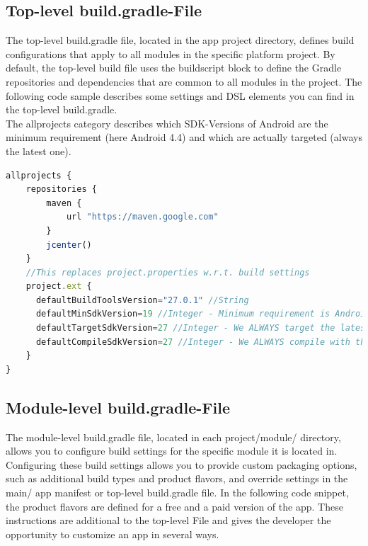 \documentclass[12pt]{article}
\begin{document}
\subsection{Top-level build.gradle-File}

The top-level build.gradle file, located in the app project directory, defines build configurations that apply to all modules in the specific platform project. By default, the top-level build file uses the buildscript block to define the Gradle repositories and dependencies that are common to all modules in the project. The following code sample describes some settings and DSL elements you can find in the top-level build.gradle.\\
The allprojects category describes which SDK-Versions of Android are the minimum requirement (here Android 4.4) and which are actually targeted (always the latest one).

\begin{lstlisting}[language=javascript]
allprojects {
    repositories {
        maven {
            url "https://maven.google.com"
        }
        jcenter()
    }
    //This replaces project.properties w.r.t. build settings
    project.ext {
      defaultBuildToolsVersion="27.0.1" //String
      defaultMinSdkVersion=19 //Integer - Minimum requirement is Android 4.4
      defaultTargetSdkVersion=27 //Integer - We ALWAYS target the latest by default
      defaultCompileSdkVersion=27 //Integer - We ALWAYS compile with the latest by default
    }
}
\end{lstlisting}


\subsection{Module-level build.gradle-File}

The module-level build.gradle file, located in each project/module/ directory, allows you to configure build settings for the specific module it is located in. Configuring these build settings allows you to provide custom packaging options, such as additional build types and product flavors, and override settings in the main/ app manifest or top-level build.gradle file. In the following code snippet, the product flavors are defined for a free and a paid version of the app. These instructions are additional to the top-level File and gives the developer the opportunity to customize an app in several ways.
\end{document}
